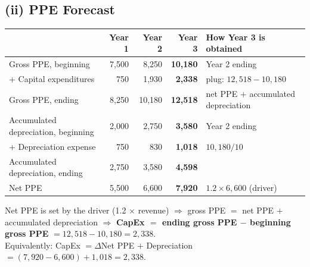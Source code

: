 \subsection{(ii) PPE Forecast}
\begin{center}
\footnotesize\setlength{\tabcolsep}{3.5pt}
\begin{tabular}{@{}lrr>{\bfseries}rl@{}}
\toprule
 & \textbf{Year 1} & \textbf{Year 2} & \textbf{Year 3} & \textbf{How Year 3 is obtained}\\
\midrule
Gross PPE, beginning & 7,500 & 8,250 & 10,180 & Year 2 ending\\
+ Capital expenditures & 750 & 1,930 & 2,338 & plug: $12{,}518-10{,}180$\\
Gross PPE, ending & 8,250 & 10,180 & 12,518 & net PPE $+$ accumulated depreciation\\
\midrule
Accumulated depreciation, beginning & 2,000 & 2,750 & 3,580 & Year 2 ending\\
+ Depreciation expense & 750 & 830 & 1,018 & $10{,}180/10$\\
Accumulated depreciation, ending & 2,750 & 3,580 & 4,598 & \\
\midrule
Net PPE & 5,500 & 6,600 & 7,920 & $1.2\times6{,}600$ (driver)\\
\bottomrule
\end{tabular}
\end{center}
\begin{keybox}
Net PPE is set by the driver (1.2 $\times$ revenue) $\Rightarrow$ gross PPE $=$ net PPE $+$ accumulated depreciation $\Rightarrow$ \textbf{CapEx $=$ ending gross PPE $-$ beginning gross PPE} $=12{,}518-10{,}180=2{,}338$.\\
Equivalently: CapEx $=\Delta$Net PPE $+$ Depreciation $=(7{,}920-6{,}600)+1{,}018=2{,}338$.
\end{keybox}

